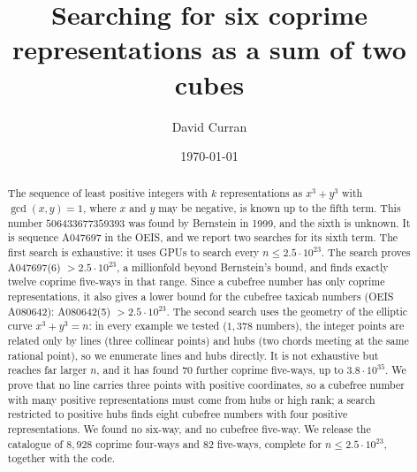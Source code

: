 \documentclass[11pt]{amsart}
\title{Searching for six coprime representations as a sum of two cubes}
\author{David Curran}
\date{\today}
\theoremstyle{remark}
\begin{document}
\begin{abstract}
The sequence of least positive integers with $k$ representations as $x^3 + y^3$ with $\gcd(x, y) = 1$, where $x$
and $y$ may be negative, is known up to the fifth term. This number $506433677359393$ was found by Bernstein in 1999, and the sixth is unknown. It is sequence A047697 in the OEIS, and we report two searches for its sixth term. The first search is exhaustive: it uses GPUs to search every $n \le 2.5\cdot10^{23}$. The search proves
A047697(6) $> 2.5\cdot10^{23}$, a millionfold beyond Bernstein's bound, and finds exactly twelve coprime five-ways in
that range. Since a cubefree number has only coprime representations, it also gives a lower bound for the cubefree taxicab numbers (OEIS A080642):
A080642(5) $> 2.5\cdot10^{23}$. The second search uses the geometry of the elliptic curve $x^3 + y^3 = n$: in every
example we tested ($1{,}378$ numbers), the integer points are related only by lines (three collinear points) and hubs
(two chords meeting at the same rational point), so we enumerate lines and hubs directly. It is not exhaustive but
reaches far larger $n$, and it has found 70 further coprime five-ways, up to $3.8\cdot10^{35}$. We prove that no line
carries three points with positive coordinates, so a cubefree number with many positive representations must come
from hubs or high rank; a search restricted to positive hubs finds eight cubefree numbers with four positive
representations. We found no six-way, and no cubefree five-way. We release the catalogue of $8{,}928$ coprime
four-ways and 82 five-ways, complete for $n \le 2.5\cdot10^{23}$, together with the
code.
\end{abstract}

\maketitle
\end{document}
